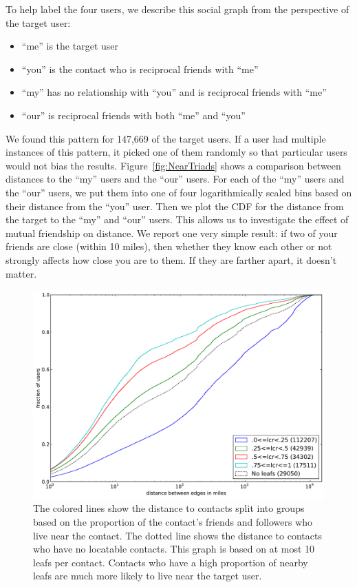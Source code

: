\documentclass[letterpaper]{article}
\begin{document}
To help label the four users, we describe this social graph from the
perspective of the target user:

\begin{itemize}
\item ``me'' is the target user
\item ``you'' is the contact who is reciprocal friends with ``me''
\item ``my'' has no relationship with ``you'' and is reciprocal friends with ``me''
\item ``our'' is reciprocal friends with both ``me'' and ``you''
\end{itemize}

We found this pattern for 147,669 of the target users.
%
If a user had multiple instances of this pattern, it picked one of them
randomly so that particular users would not bias the results.
%
%
Figure~\ref{fig:NearTriads} shows a comparison between distances to the ``my''
users and the ``our'' users.
%
For each of the ``my'' users and the ``our'' users, we put them into one of
four logarithmically scaled bins based on their distance from the ``you'' user.
%
Then we plot the CDF for the distance from the target to the ``my'' and ``our'' users.
%
This allows us to investigate the effect of mutual friendship on distance.
We report one very simple result: if two of your friends are close (within 10
miles), then whether they know each other or not strongly affects how close
you are to them.
%
If they are farther apart, it doesn't matter.

\begin{figure}[tbh]
\centering
\includegraphics[width=\linewidth]{figures/locals_10.pdf}
\caption{
The colored lines show the distance to contacts split into groups based on the
proportion of the contact's friends and followers who live near the contact.
The dotted line shows the distance to contacts who have no locatable contacts.
This graph is based on at most 10 leafs per contact.
Contacts who have a high proportion of nearby leafs are much more likely to
live near the target user.
}
\label{fig:Local10}
\end{figure}
\end{document}
